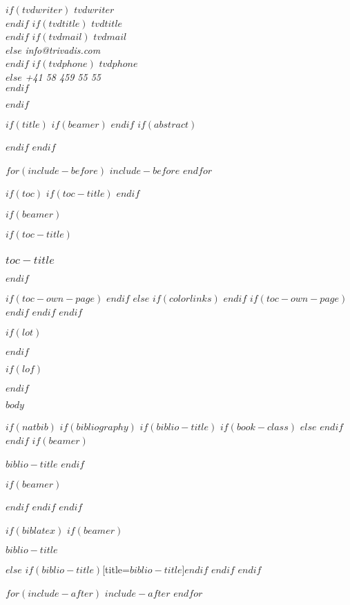 \documentclass[$if(fontsize)$$fontsize$,$endif$$if(lang)$$babel-lang$,$endif$$if(papersize)$$papersize$paper,$else$a4paper,$endif$$if(beamer)$ignorenonframetext,$if(handout)$handout,$endif$$if(aspectratio)$aspectratio=$aspectratio$,$endif$$endif$$for(classoption)$$classoption$$sep$,$endfor$,tablecaptionabove]{$if(book)$scrbook$else$scrartcl$endif$}
\newif\ifbibliography
\begin{document}
\begin{titlepage}
  \begin{flushright}
    $if(tvdwriter)$ \textit{$tvdwriter$\\} $endif$
    $if(tvdtitle)$ \textit{$tvdtitle$\\} $endif$
    $if(tvdmail)$ \textit{$tvdmail$\\}  $else$ \textit{info@trivadis.com\\} $endif$
    $if(tvdphone)$ \textit{$tvdphone$\\}  $else$ \textit{+41 58 459 55 55\\} $endif$
  \end{flushright}
  \end{titlepage}
$endif$

$if(title)$
  $if(beamer)$
    \frame{\titlepage}
  $endif$
  $if(abstract)$
    \begin{abstract}
      $abstract$
    \end{abstract}
  $endif$
$endif$

$for(include-before)$
  $include-before$
$endfor$

$if(toc)$
  $if(toc-title)$
    \renewcommand*\contentsname{$toc-title$}
  $endif$

  $if(beamer)$
    \begin{frame}
      $if(toc-title)$
        \frametitle{$toc-title$}
      $endif$
      \tableofcontents[hideallsubsections]
    \end{frame}
    $if(toc-own-page)$
      \newpage
    $endif$
  $else$
    {
      $if(colorlinks)$
        \hypersetup{linkcolor=$if(toccolor)$$toccolor$$else$$endif$}
      $endif$
      \setcounter{tocdepth}{$toc-depth$}
      \tableofcontents
      $if(toc-own-page)$
        \newpage
      $endif$
    }
  $endif$
$endif$

$if(lot)$
  \listoftables
$endif$

$if(lof)$
  \listoffigures
$endif$

$body$

$if(natbib)$
  $if(bibliography)$
    $if(biblio-title)$
      $if(book-class)$
        \renewcommand\bibname{$biblio-title$}
      $else$
        \renewcommand\refname{$biblio-title$}
      $endif$
    $endif$
    $if(beamer)$
      \begin{frame}[allowframebreaks]{$biblio-title$}
        \bibliographytrue
      $endif$
      
    $if(beamer)$
      \end{frame}
    $endif$
  $endif$
$endif$

$if(biblatex)$
  $if(beamer)$
    \begin{frame}[allowframebreaks]{$biblio-title$}
      \bibliographytrue
      \printbibliography[heading=none]
    \end{frame}
  $else$
    \printbibliography$if(biblio-title)$[title=$biblio-title$]$endif$
  $endif$
$endif$

$for(include-after)$
  $include-after$
$endfor$
\end{document}
